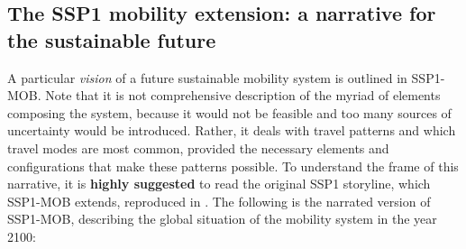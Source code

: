 \subsection[The SSP1 mobility extension]{The SSP1 mobility extension: a narrative for the sustainable future}
\label{ss:results:ssp1-mob-development}
A particular \emph{vision} of a future sustainable mobility system is outlined in SSP1-MOB. Note that it is not comprehensive description of the myriad of elements composing the system, because it would not be feasible and too many sources of uncertainty would be introduced. Rather, it deals with travel patterns and which travel modes are most common, provided the necessary elements and configurations that make these patterns possible. To understand the frame of this narrative, it is \textbf{highly suggested} to read the original SSP1 storyline, which SSP1-MOB extends, reproduced in . The following is the narrated version of SSP1-MOB, describing the global situation of the mobility system in the year 2100:
%
